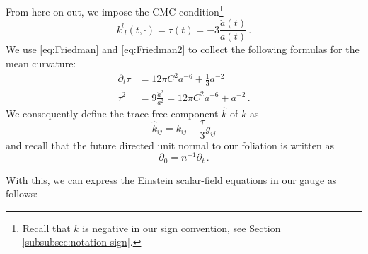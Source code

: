 \documentclass[11pt,leqno,textwidth=10cm]{amsart}
\numberwithin{equation}{section}
\theoremstyle{definition}
\theoremstyle{plain}
\newcommand{\1}{\mathbbm{1}}
\newcommand{\del}{\partial}
\newcommand{\change}[1]{\color{black}#1\color{black}}
\begin{document}
From here on out, we impose the CMC condition\change{\footnote{\change{Recall that $k$ is negative in our sign convention, see Section \ref{subsubsec:notation-sign}.}}}
\begin{equation}\label{eq:CMC}
{k^{l}}_l(t,\cdot)=\tau(t)=-3\frac{\dot{a}(t)}{a(t)}\,.
\end{equation}
We use \eqref{eq:Friedman} and \eqref{eq:Friedman2} to collect the following formulas for the mean curvature:
\begin{align}
\label{eq:Hubble} \del_t\tau%
&=12\pi C^2a^{-6}+\frac13a^{-2}\\
\label{eq:Hubble2} \tau^2&=9\frac{\dot{a}^2}{a^2}=12\pi C^2a^{-6}+a^{-2}\,.
\end{align}
We consequently define the trace-free component $\hat{k}$ of $k$ as
\begin{equation}
\hat{k}_{ij}=k_{ij}-\frac{\tau}3g_{ij}
\end{equation}
and recall that the future directed unit normal to our foliation is written as
\begin{equation}
\del_0=n^{-1}\del_t\,.
\end{equation}

With this, we can express the Einstein scalar-field equations in our gauge as follows:
\end{document}
